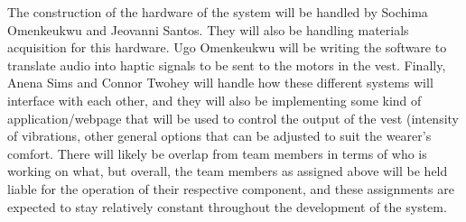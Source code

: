 The construction of the hardware of the system will be handled by Sochima Omenkeukwu and Jeovanni Santos. They will also be handling materials acquisition for this hardware. Ugo Omenkeukwu will be writing the software to translate audio into haptic signals to be sent to the motors in the vest. Finally, Anena Sims and Connor Twohey will handle how these different systems will interface with each other, and they will also be implementing some kind of application/webpage that will be used to control the output of the vest (intensity of vibrations, other general options that can be adjusted to suit the wearer’s comfort. There will likely be overlap from team members in terms of who is working on what, but overall, the team members as assigned above will be held liable for the operation of their respective component, and these assignments are expected to stay relatively constant throughout the development of the system.